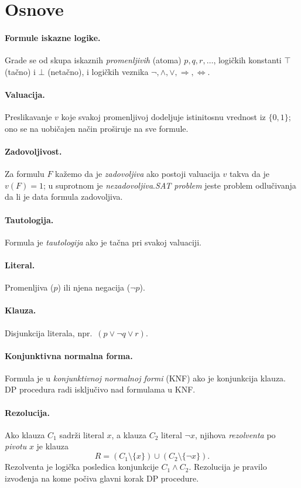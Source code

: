 \documentclass[a4paper,10pt]{article}
\begin{document}
\section{Osnove}
\label{sec:osnove}

\paragraph{Formule iskazne logike.} Grade se od skupa iskaznih \emph{promenljivih} (atoma) $p, q, r, \dots$, logičkih konstanti $\top$ (tačno) i $\bot$ (netačno), i logičkih veznika $\neg, \wedge, \vee, \Rightarrow, \Leftrightarrow$.
\paragraph{Valuacija.} Preslikavanje $v$ koje svakoj promenljivoj dodeljuje istinitosnu vrednost iz $\{0, 1\}$; ono se na uobičajen način proširuje na sve formule. 
\paragraph{Zadovoljivost.} Za formulu $F$ kažemo da je \emph{zadovoljiva} ako postoji valuacija $v$ takva da je $v(F) = 1$; u suprotnom je \emph{nezadovoljiva}.\emph{SAT problem} jeste problem odlučivanja da li je data formula zadovoljiva.
\paragraph{Tautologija.}Formula je \emph{tautologija} ako je tačna pri svakoj valuaciji. 

 \paragraph{Literal.} Promenljiva ($p$) ili njena negacija ($\neg p$).
\paragraph{Klauza.} Disjunkcija literala, npr.\ $(p \vee \neg q \vee r)$.
\paragraph{Konjunktivna normalna forma.} Formula je u \emph{konjunktivnoj normalnoj formi} (KNF) ako je konjunkcija klauza. DP procedura radi isključivo nad formulama u KNF.


\paragraph{Rezolucija.} Ako klauza $C_1$ sadrži literal $x$, a klauza $C_2$ literal $\neg x$, njihova \emph{rezolventa} po \emph{pivotu} $x$ je klauza
\[
  R = (C_1 \setminus \{x\}) \cup (C_2 \setminus \{\neg x\}).
\]
Rezolventa je logička posledica konjunkcije $C_1 \wedge C_2$. Rezolucija je pravilo izvođenja na kome počiva glavni korak DP procedure.
\end{document}
